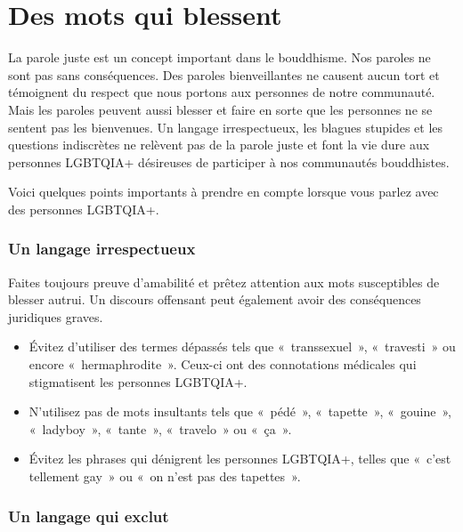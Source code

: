 \documentclass[12pt,openany]{book}
\begin{document}
\section*{Des mots qui blessent}

\noindent La parole juste est un concept important dans le bouddhisme. Nos paroles ne sont pas sans conséquences. Des paroles bienveillantes ne causent aucun tort et témoignent du respect que nous portons aux personnes de notre communauté. Mais les paroles peuvent aussi blesser et faire en sorte que les personnes ne se sentent pas les bienvenues. Un langage irrespectueux, les blagues stupides et les questions indiscrètes ne relèvent pas de la parole juste et font la vie dure aux personnes \mbox{LGBTQIA+} désireuses de participer à nos communautés bouddhistes.

Voici quelques points importants à prendre en compte lorsque vous parlez avec des personnes \mbox{LGBTQIA+}.

\subsubsection*{Un langage irrespectueux}

\noindent Faites toujours preuve d’amabilité et prêtez attention aux mots susceptibles de blesser autrui. Un discours offensant peut également avoir des conséquences juridiques graves.

\begin{itemize}[label=\textbullet]
  \setlength\itemsep{-0.3em}
  \item Évitez d’utiliser des termes dépassés tels que \mbox{« transsexuel »}, \mbox{« travesti »} ou encore \mbox{« hermaphrodite »}. Ceux-ci ont des connotations médicales qui stigmatisent les personnes \mbox{LGBTQIA+}.
  \item N’utilisez pas de mots insultants tels que \mbox{« pédé »}, \mbox{« tapette »}, \mbox{« gouine »}, \mbox{« ladyboy »}, \mbox{« tante »}, \mbox{« travelo »} ou \mbox{« ça »}.
  \item Évitez les phrases qui dénigrent les personnes \mbox{LGBTQIA+}, telles que \mbox{« c}’est tellement ga\mbox{y »} ou \mbox{« o}n n’est pas des tapette\mbox{s »}.
\end{itemize}

\subsubsection*{Un langage qui exclut}
\end{document}

